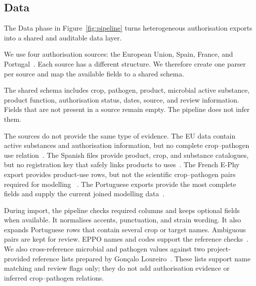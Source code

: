 \subsection{Data}\label{subsec:data-sources-and-data-integration}

The Data phase in Figure~\ref{fig:pipeline} turns heterogeneous authorisation exports into a shared and auditable data layer.

We use four authorisation sources: the European Union, Spain, France, and Portugal~\cite{ec-pesticides-database, mapa-regfiweb,anses-ephy,dgav-sifito}.
Each source has a different structure. We therefore create one parser per source and map the available fields to a shared schema.

The shared schema includes crop, pathogen, product, microbial active substance, product function, authorisation status, dates, source, and review information.
Fields that are not present in a source remain empty.
The pipeline does not infer them.

The sources do not provide the same type of evidence.
The EU data contain active substances and authorisation information, but no complete crop--pathogen use relation~\cite{eu-dataset-snapshot}.
The Spanish files provide product, crop, and substance catalogues, but no registration key that safely links products to uses~\cite{spain-dataset-snapshot}.
The French E-Phy export provides product-use rows, but not the scientific crop--pathogen pairs required for modelling ~\cite{france-dataset-snapshot}.
The Portuguese exports provide the most complete fields and supply the current joined modelling data~\cite{dgav-sifito}.

During import, the pipeline checks required columns and keeps optional fields when available.
It normalises accents, punctuation, and strain wording.
It also expands Portuguese rows that contain several crop or target names.
Ambiguous pairs are kept for review.
EPPO names and codes support the reference checks~\cite{eppo-global-database}.
We also cross-reference microbial and pathogen values against two project-provided reference lists prepared by Gonçalo Loureiro~\cite{student-reference-lists}.
These lists support name matching and review flags only; they do not add authorisation evidence or inferred crop--pathogen relations.
